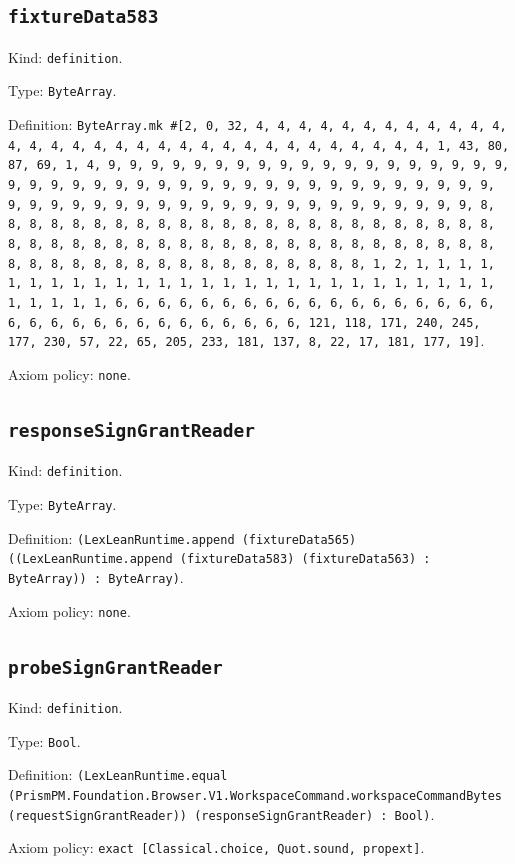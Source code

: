\documentclass[11pt]{article}
\begin{document}
\subsection*{\texttt{fixtureData583}}
\noindent Kind: \texttt{definition}.\par
\noindent Type: \texttt{ByteArray}.\par
\noindent Definition: \texttt{ByteArray.mk \#[2, 0, 32, 4, 4, 4, 4, 4, 4, 4, 4, 4, 4, 4, 4, 4, 4, 4, 4, 4, 4, 4, 4, 4, 4, 4, 4, 4, 4, 4, 4, 4, 4, 4, 4, 1, 43, 80, 87, 69, 1, 4, 9, 9, 9, 9, 9, 9, 9, 9, 9, 9, 9, 9, 9, 9, 9, 9, 9, 9, 9, 9, 9, 9, 9, 9, 9, 9, 9, 9, 9, 9, 9, 9, 9, 9, 9, 9, 9, 9, 9, 9, 9, 9, 9, 9, 9, 9, 9, 9, 9, 9, 9, 9, 9, 9, 9, 9, 9, 9, 9, 9, 9, 9, 9, 9, 8, 8, 8, 8, 8, 8, 8, 8, 8, 8, 8, 8, 8, 8, 8, 8, 8, 8, 8, 8, 8, 8, 8, 8, 8, 8, 8, 8, 8, 8, 8, 8, 8, 8, 8, 8, 8, 8, 8, 8, 8, 8, 8, 8, 8, 8, 8, 8, 8, 8, 8, 8, 8, 8, 8, 8, 8, 8, 8, 8, 8, 8, 8, 8, 1, 2, 1, 1, 1, 1, 1, 1, 1, 1, 1, 1, 1, 1, 1, 1, 1, 1, 1, 1, 1, 1, 1, 1, 1, 1, 1, 1, 1, 1, 1, 1, 1, 1, 6, 6, 6, 6, 6, 6, 6, 6, 6, 6, 6, 6, 6, 6, 6, 6, 6, 6, 6, 6, 6, 6, 6, 6, 6, 6, 6, 6, 6, 6, 6, 6, 121, 118, 171, 240, 245, 177, 230, 57, 22, 65, 205, 233, 181, 137, 8, 22, 17, 181, 177, 19]}.\par
\noindent Axiom policy: \texttt{none}.\par
\subsection*{\texttt{responseSignGrantReader}}
\noindent Kind: \texttt{definition}.\par
\noindent Type: \texttt{ByteArray}.\par
\noindent Definition: \texttt{(LexLeanRuntime.append (fixtureData565) ((LexLeanRuntime.append (fixtureData583) (fixtureData563) : ByteArray)) : ByteArray)}.\par
\noindent Axiom policy: \texttt{none}.\par
\subsection*{\texttt{probeSignGrantReader}}
\noindent Kind: \texttt{definition}.\par
\noindent Type: \texttt{Bool}.\par
\noindent Definition: \texttt{(LexLeanRuntime.equal (PrismPM.Foundation.Browser.V1.WorkspaceCommand.workspaceCommandBytes (requestSignGrantReader)) (responseSignGrantReader) : Bool)}.\par
\noindent Axiom policy: \texttt{exact [Classical.choice, Quot.sound, propext]}.\par
\end{document}
